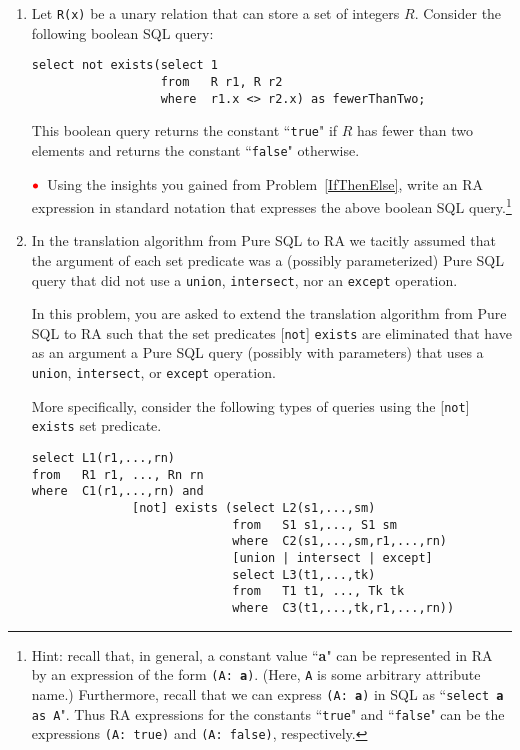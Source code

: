 \documentclass[11pt]{article}
\newcommand{\red}[1]{{\color{red}#1}}
\newcommand{\redbullet}{$\red{\bullet}$}
\begin{document}
\begin{enumerate}[resume]
\item\label{existsInSelect} Let {\tt R(x)} be a unary relation that can store a
set of integers $R$.
Consider the following boolean SQL query:

{\footnotesize
\begin{verbatim}
select not exists(select 1
                  from   R r1, R r2
                  where  r1.x <> r2.x) as fewerThanTwo;
\end{verbatim}}

This boolean query returns the constant ``{\tt true}" if $R$ has fewer than two elements 
and returns the constant ``{\tt false}" otherwise.

\redbullet\ Using the insights you gained from Problem~\ref{IfThenElse}, 
write an RA expression in standard notation that expresses the above boolean SQL query.\footnote{
Hint:  recall that, in general, a constant value ``{\bf a}" can be represented
in RA by an expression of the form {\tt (A: {\bf a})}.   (Here, {\tt A} is some arbitrary attribute name.) Furthermore, recall that
we can express {\tt (A: {\bf a})} in SQL as ``{\tt select {\bf a} as A}".
Thus RA expressions for the constants ``{\tt true}"  and ``{\tt false}" can be the
expressions {\tt (A: true)} and {\tt (A: false)}, respectively.}


\item  In the translation algorithm from Pure SQL to RA
we tacitly assumed that the argument of each set predicate was a (possibly parameterized)
Pure SQL query that did not use a {\tt union}, {\tt intersect}, nor an {\tt except} operation.

In this problem, you are asked to extend the translation algorithm from Pure SQL to RA
such that the set predicates [{\tt not}] {\tt exists} are eliminated that have as an
argument a Pure SQL query (possibly with parameters) that uses
a {\tt union}, {\tt intersect}, or {\tt except} operation.


More specifically, consider the following types of queries using the
[{\tt not}] {\tt exists} set predicate.
{\footnotesize
\begin{verbatim}
select L1(r1,...,rn)
from   R1 r1, ..., Rn rn
where  C1(r1,...,rn) and 
              [not] exists (select L2(s1,...,sm)
                            from   S1 s1,..., S1 sm
                            where  C2(s1,...,sm,r1,...,rn)
                            [union | intersect | except]
                            select L3(t1,...,tk)
                            from   T1 t1, ..., Tk tk
                            where  C3(t1,...,tk,r1,...,rn))
\end{verbatim}
}


\end{enumerate}
\end{document}
